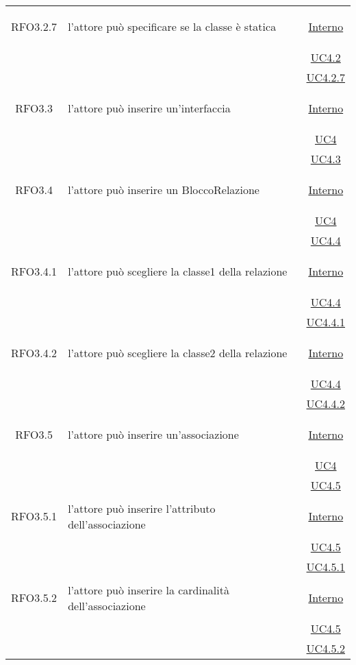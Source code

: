\begin{longtable}{|c|>{\centering}m{7cm}|c|}
\hypertarget{RFO3.2.7}{RFO3.2.7} & l'attore può specificare se la classe è statica & \hyperlink{Interno}{Interno}\\
& &\hyperref[UC4.2]{UC4.2}\\
& &\hyperref[UC4.2.7]{UC4.2.7}\\ \hline

\hypertarget{RFO3.3}{RFO3.3} & l'attore può inserire un'interfaccia &  \hyperlink{Interno}{Interno}\\
& &\hyperref[UC4]{UC4}\\
& &\hyperref[UC4.3]{UC4.3}\\ \hline

\hypertarget{RFO3.4}{RFO3.4} & l'attore può inserire un BloccoRelazione &  \hyperlink{Interno}{Interno}\\
& &\hyperref[UC4]{UC4}\\
& &\hyperref[UC4.4]{UC4.4}\\ \hline

\hypertarget{RFO3.4.1}{RFO3.4.1} & l'attore può scegliere la classe1 della relazione &  \hyperlink{Interno}{Interno}\\
& &\hyperref[UC4.4]{UC4.4}\\
& &\hyperref[UC4.4.1]{UC4.4.1}\\ \hline

\hypertarget{RFO3.4.2}{RFO3.4.2} & l'attore può scegliere la classe2 della relazione &  \hyperlink{Interno}{Interno}\\
& &\hyperref[UC4.4]{UC4.4}\\
& &\hyperref[UC4.4.2]{UC4.4.2}\\ \hline

\hypertarget{RFO3.5}{RFO3.5} & l'attore può inserire un'associazione &  \hyperlink{Interno}{Interno}\\
& &\hyperref[UC4]{UC4}\\
& &\hyperref[UC4.5]{UC4.5}\\ \hline

\hypertarget{RFO3.5.1}{RFO3.5.1} & l'attore può inserire l'attributo dell'associazione &  \hyperlink{Interno}{Interno}\\
& &\hyperref[UC4.5]{UC4.5}\\
& &\hyperref[UC4.5.1]{UC4.5.1}\\ \hline

\hypertarget{RFO3.5.2}{RFO3.5.2} & l'attore può inserire la cardinalità dell'associazione &  \hyperlink{Interno}{Interno}\\
& &\hyperref[UC4.5]{UC4.5}\\
& &\hyperref[UC4.5.2]{UC4.5.2}\\ \hline


\end{longtable}
